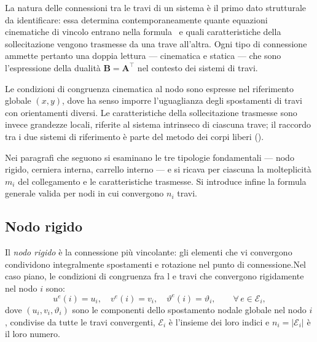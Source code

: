 La natura delle connessioni tra le travi di un sistema è il
primo dato strutturale da identificare: essa determina
contemporaneamente quante equazioni cinematiche di vincolo
entrano nella formula~ e quali
caratteristiche della sollecitazione vengono trasmesse
da una trave all'altra. Ogni tipo di connessione ammette
pertanto una doppia lettura --- cinematica e statica ---
che sono l'espressione della dualità $\bm{B} = \bm{A}^{\top}$
nel contesto dei sistemi di travi.

Le condizioni di congruenza cinematica al nodo sono
espresse nel riferimento globale $(x, y)$, dove ha senso
imporre l'uguaglianza degli spostamenti di travi con
orientamenti diversi. Le caratteristiche della
sollecitazione trasmesse sono invece grandezze locali,
riferite al sistema intrinseco di ciascuna trave; il
raccordo tra i due sistemi di riferimento è parte del
metodo dei corpi liberi ().

Nei paragrafi che seguono si esaminano le tre tipologie
fondamentali --- nodo rigido, cerniera interna, carrello
interno --- e si ricava per ciascuna la molteplicità
$m_i$ del collegamento e le caratteristiche trasmesse.
Si introduce infine la formula generale valida per nodi
in cui convergono $n_i$ travi.


\subsection{Nodo rigido}
\label{subsec:nodo_rigido}

Il \emph{nodo rigido} è la connessione più vincolante:
gli elementi che vi convergono condividono integralmente
spostamenti e rotazione nel punto di connessione.Nel caso piano, le condizioni di congruenza fra l
e travi che convergono rigidamente nel nodo $i$  sono:
\begin{equation}\label{eq:cong_nodo_rigido}
	u^e(i) = u_i, \quad
	v^e(i) = v_i, \quad
	\vartheta^e(i) = \vartheta_i, \qquad \forall\, e \in \mathcal{E}_i,
\end{equation}
dove $(u_i, v_i, \vartheta_i)$ sono le componenti dello
spostamento nodale globale nel nodo $i$, condivise da
tutte le travi convergenti, $\mathcal{E}_i$ è l'insieme
dei loro indici e $n_i = |\mathcal{E}_i|$ è il loro numero.


